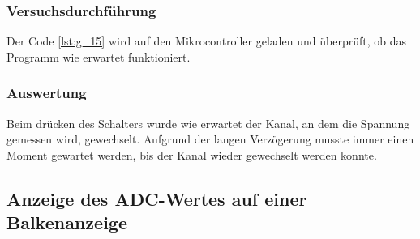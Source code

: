 \documentclass[12pt,a4paper]{article}
\begin{document}
\subsubsection*{Versuchsdurchführung}

Der Code \ref{lst:g_15} wird auf den Mikrocontroller geladen und überprüft, ob das Programm wie erwartet funktioniert.

\subsubsection*{Auswertung}

Beim drücken des Schalters wurde wie erwartet der Kanal, an dem die Spannung gemessen wird, gewechselt. Aufgrund der langen Verzögerung musste immer einen Moment gewartet werden, bis der Kanal wieder gewechselt werden konnte.

\subsection{Anzeige des ADC-Wertes auf einer Balkenanzeige}
\end{document}
